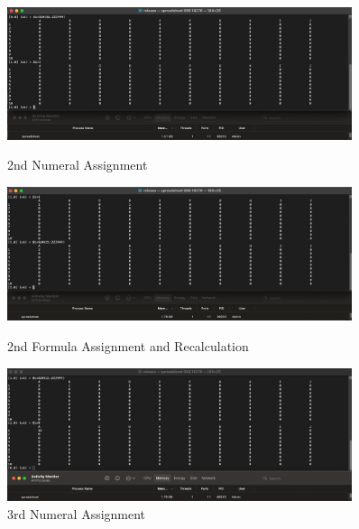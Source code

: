 \documentclass[10pt,a4paper]{article}  %
\begin{document}
\begin{figure}[h!]
    \centering
    \begin{minipage}{0.3\textwidth}
        \centering
        \includegraphics[width=0.9\textwidth]{2num.jpeg}
        \caption{2nd Numeral Assignment}
        \label{fig:2num}
    \end{minipage}\hfill
    \begin{minipage}{0.3\textwidth}
        \centering
        \includegraphics[width=0.9\textwidth]{2for.jpeg}
        \caption{2nd Formula Assignment and Recalculation}
        \label{fig:2for}
    \end{minipage}\hfill
    \begin{minipage}{0.3\textwidth}
        \centering
        \includegraphics[width=0.9\textwidth]{3num.jpeg}
        \caption{3rd Numeral Assignment}
        \label{fig:3num}
    \end{minipage}
\end{figure}
\end{document}
